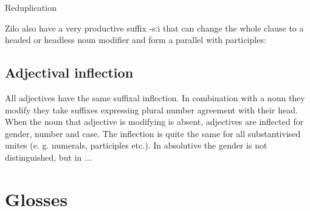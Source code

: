 Reduplication

Zilo also have a very productive suffix -sːi that can change the whole clause to a headed or headless noun modifier and form a parallel with participles: 

\subsection{Adjectival inflection}
All adjectives have the same suffixal inflection. In combination with a noun they modify they take suffixes expressing plural number agreement with their head. When the noun that adjective is modifying is absent, adjectives are inflected for gender, number and case. The inflection is quite the same for all substantivised unites (e. g. numerals, participles etc.).  In absolutive the gender is not distinguished, but in ...



\section*{Glosses}
\small
\printglosses


\normalsize
